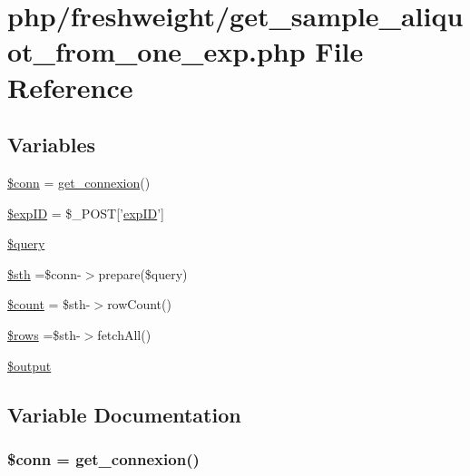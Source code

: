 \hypertarget{get__sample__aliquot__from__one__exp_8php}{\section{php/freshweight/get\-\_\-sample\-\_\-aliquot\-\_\-from\-\_\-one\-\_\-exp.php File Reference}
\label{get__sample__aliquot__from__one__exp_8php}
}
\subsection*{Variables}
\begin{DoxyCompactItemize}
\item 
\hyperlink{get__sample__aliquot__from__one__exp_8php_aa8a5a87b9c1a6a0819b88447cbe41877}{\$conn} = \hyperlink{php__functions_8php_ace18bc10f3fd08f92688ac743e0d8c2e}{get\-\_\-connexion}()
\item 
\hyperlink{get__sample__aliquot__from__one__exp_8php_ae384d32e62e85e587cd27bf249ed3db3}{\$exp\-I\-D} = \$\-\_\-\-P\-O\-S\-T\mbox{[}'\hyperlink{admin_rawdata_8php_a888d53a6517f4272b5982c3ca9d16e8a}{exp\-I\-D}'\mbox{]}
\item 
\hyperlink{get__sample__aliquot__from__one__exp_8php_af59a5f7cd609e592c41dc3643efd3c98}{\$query}
\item 
\hyperlink{get__sample__aliquot__from__one__exp_8php_afa9126f9664959c02795be300a135f93}{\$sth} =\$conn-\/$>$prepare(\$query)
\item 
\hyperlink{get__sample__aliquot__from__one__exp_8php_af789423037bbc89dc7c850e761177570}{\$count} = \$sth-\/$>$row\-Count()
\item 
\hyperlink{get__sample__aliquot__from__one__exp_8php_ace2ec39e7df3899fa8df9640ec274b03}{\$rows} =\$sth-\/$>$fetch\-All()
\item 
\hyperlink{get__sample__aliquot__from__one__exp_8php_a73004ce9cd673c1bfafd1dc351134797}{\$output}
\end{DoxyCompactItemize}


\subsection{Variable Documentation}
\hypertarget{get__sample__aliquot__from__one__exp_8php_aa8a5a87b9c1a6a0819b88447cbe41877}{
\subsubsection[{\$conn}]{\setlength{\rightskip}{0pt plus 5cm}\$conn = {\bf get\-\_\-connexion}()}}\label{get__sample__aliquot__from__one__exp_8php_aa8a5a87b9c1a6a0819b88447cbe41877}


